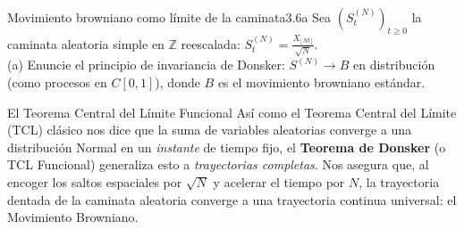 \documentclass[10pt,a4paper]{article}
\begin{document}
\begin{ejercicio}{Movimiento browniano como límite de la caminata}{3.6a}
    Sea $(S^{(N)}_t)_{t \ge 0}$ la caminata aleatoria simple en $\mathbb{Z}$ reescalada: $S^{(N)}_t = \frac{X_{\lfloor Nt \rfloor}}{\sqrt{N}}$. \\
    (a) Enuncie el principio de invariancia de Donsker: $S^{(N)} \to B$ en distribución (como procesos en $C[0,1]$), donde $B$ es el movimiento browniano estándar.
\end{ejercicio}

\vspace{2mm}

\begin{nota}{El Teorema Central del Límite Funcional}
    Así como el Teorema Central del Límite (TCL) clásico nos dice que la suma de variables aleatorias converge a una distribución Normal en un \textit{instante} de tiempo fijo, el \textbf{Teorema de Donsker} (o TCL Funcional) generaliza esto a \textit{trayectorias completas}. Nos asegura que, al encoger los saltos espaciales por $\sqrt{N}$ y acelerar el tiempo por $N$, la trayectoria dentada de la caminata aleatoria converge a una trayectoria continua universal: el Movimiento Browniano.
\end{nota}

\vspace{5mm}
\end{document}

